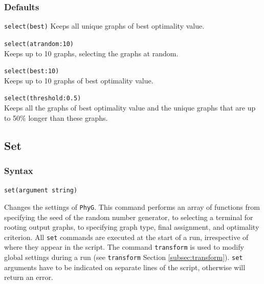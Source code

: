 	\subsubsection{Defaults}
		\texttt{select(best)} Keeps all unique graphs of best optimality value.
		
	\begin{example}
		\item{\texttt{select(atrandom:10)}\\ Keeps up to 10 graphs, selecting the graphs
		 at random.}
						
		\item{\texttt{select(best:10)}\\ Keeps up to 10 graphs of best optimality value.}
		
		\item{\texttt{select(threshold:0.5)}\\ Keeps all the graphs of best optimality value
		and the unique graphs that are up to 50\% longer than these graphs. }
	\end{example}

\subsection{Set}
\label{subsec:set}
	\subsubsection{Syntax}
		\texttt{set(argument string)}
	
	\begin{phygdescription}
		{Changes the settings of \texttt{PhyG}. This command performs an array of functions
		from specifying the seed of the random number generator, to selecting a terminal for
		rooting output graphs, to specifying  graph type, final assignment, and optimality 
		criterion. All \texttt{set} commands are executed at the start of a run, irrespective of
		where they appear in the script. The command \texttt{transform} is used to modify 
		global settings during a run (see \texttt{transform} Section \ref{subsec:transform}).
		\texttt{set} arguments have to be indicated on separate lines of the script, otherwise
		\phyg will return an error.}
	\end{phygdescription}
			
